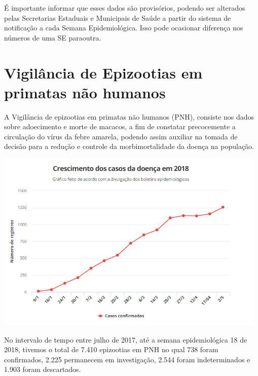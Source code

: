 \documentclass{article}
\begin{document}
\begin{multicols*}{2}
{    É importante informar que esses dados são provisórios, podendo ser alterados pelas Secretarias Estaduais e Municipais de Saúde a partir do sistema de notificação a cada Semana Epidemiológica. Isso pode ocasionar diferença nos números de uma SE paraoutra.
    
    }%
    
   
   
   
   
   
   
   
 
\section*{Vigilância de Epizootias em primatas não humanos} %

	{\large %

    A Vigilância de epizootias em primatas não humanos (PNH), consiste nos dados sobre adoecimento e morte de macacos, a fim de constatar precocemente a circulação do vírus da febre amarela, podendo assim auxiliar na tomada de decisão para a redução e controle da morbimortalidade da doença na população.
    
       \includegraphics[width=.5\textwidth]{grafico_alteravel_epidem.png}
       
No intervalo de tempo entre julho de 2017, até a semana epidemiológica 18 de 2018, tivemos o total de 7.410 epizootias em PNH no qual 738 foram confirmados, 2.225 permanecem em investigação, 2.544 foram indeterminados e 1.903 foram descartados.

}
\end{multicols*}
\end{document}
